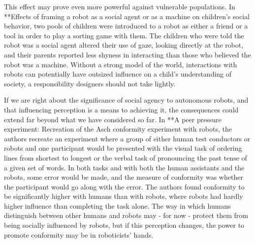 \documentclass{sfuthesis}
\begin{document}
This effect may prove even more powerful against vulnerable populations. In **Effects of framing a robot as a social agent or as a machine on children's social behavior, two pools of children were introduced to a robot as either a friend or a tool in order to play a sorting game with them. The children who were told the robot was a social agent altered their use of gaze, looking directly at the robot, and their parents reported less shyness in interacting than those who believed the robot was a machine. Without a strong model of the world, interactions with robots can potentially have outsized influence on a child's understanding of society, a responsibility designers should not take lightly.

If we are right about the significance of social agency to autonomous robots, and that influencing perception is a means to achieving it, the consequences could extend far beyond what we have considered so far. In **A peer pressure experiment: Recreation of the Asch conformity experiment with robots, the authors recreate an experiment where a group of either human test conductors or robots and one participant would be presented with the visual task of ordering lines from shortest to longest or the verbal task of pronouncing the past tense of a given set of words. In both tasks and with both the human assistants and the robots, some error would be made, and the measure of conformity was whether the participant would go along with the error. The authors found conformity to be significantly higher with humans than with robots, where robots had hardly higher influence than completing the task alone. The way in which humans distinguish between other humans and robots may - for now - protect them from being socially influenced by robots, but if this perception changes, the power to promote conformity may be in roboticists' hands. 



\end{document}
